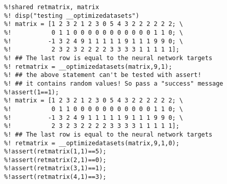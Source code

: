 \begin{verbatim}
%!shared retmatrix, matrix
%! disp("testing __optimizedatasets")
%! matrix = [1 2 3 2 1 2 3 0 5 4 3 2 2 2 2 2 2; \
%!			 0 1 1 0 0 0 0 0 0 0 0 0 0 0 1 1 0; \
%!			-1 3 2 4 9 1 1 1 1 1 9 1 1 1 9 9 0; \
%!			 2 3 2 3 2 2 2 2 3 3 3 3 1 1 1 1 1];
%! ## The last row is equal to the neural network targets
%! retmatrix = __optimizedatasets(matrix,9,1);
%! ## the above statement can't be tested with assert!
%! ## it contains random values! So pass a "success" message
%!assert(1==1);
%! matrix = [1 2 3 2 1 2 3 0 5 4 3 2 2 2 2 2 2; \
%!			 0 1 1 0 0 0 0 0 0 0 0 0 0 0 1 1 0; \
%!			-1 3 2 4 9 1 1 1 1 1 9 1 1 1 9 9 0; \
%!			 2 3 2 3 2 2 2 2 3 3 3 3 1 1 1 1 1];
%! ## The last row is equal to the neural network targets
%! retmatrix = __optimizedatasets(matrix,9,1,0);
%!assert(retmatrix(1,1)==5);
%!assert(retmatrix(2,1)==0);
%!assert(retmatrix(3,1)==1);
%!assert(retmatrix(4,1)==3);
\end{verbatim}
